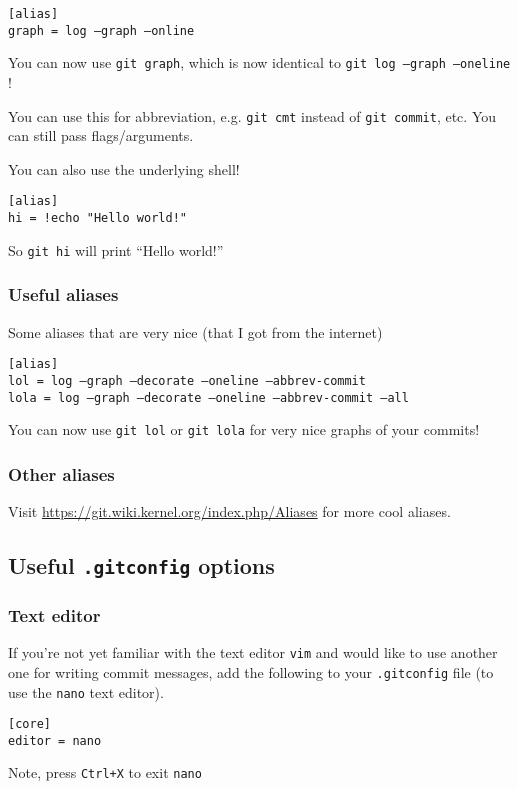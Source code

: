 \documentclass[12pt]{article}
\begin{document}
\texttt{[alias]\\
graph = log --graph --online
}

You can now use \texttt{git graph}, which is now identical to \texttt{git log --graph --oneline} !

You can use this for abbreviation, e.g. \texttt{git cmt} instead of \texttt{git commit}, etc. You can still pass flags/arguments.

You can also use the underlying shell!

\texttt{[alias]\\
hi = !echo "Hello world!"
}

So \texttt{git hi} will print ``Hello world!''


\subsubsection{Useful aliases}
Some aliases that are very nice (that I got from the internet)

\texttt{[alias]\\
lol = log --graph --decorate --oneline --abbrev-commit\\
lola = log --graph --decorate --oneline --abbrev-commit --all\\
}

You can now use \texttt{git lol} or \texttt{git lola} for very nice graphs of your commits!

\subsubsection{Other aliases}
Visit \url{https://git.wiki.kernel.org/index.php/Aliases} for more cool aliases.
\subsection{Useful \texttt{.gitconfig} options}

\subsubsection{Text editor}
If you're not yet familiar with the text editor \texttt{vim} and would like to use another one for writing commit messages, add the following to your \texttt{.gitconfig} file (to use the \texttt{nano} text editor).

\texttt{[core]\\
editor = nano }

Note, press \texttt{Ctrl+X} to exit \texttt{nano}
\end{document}
